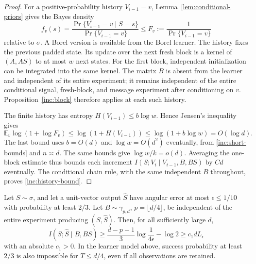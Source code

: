 \begin{proof}
For a positive-probability history \(V_{i-1}=v\),
Lemma~\ref{lem:conditional-priors} gives the Bayes density
\[
 f_v(s)=\frac{\Pr\{V_{i-1}=v\mid S=s\}}{\Pr\{V_{i-1}=v\}}
 \le F_v:=\frac1{\Pr\{V_{i-1}=v\}}
\]
relative to \(\sigma\).  A Borel version is available from the Borel
learner.  The history fixes the previous padded state.  Its update
over the next fresh block is a kernel of \((A,AS)\) to at most \(w\)
next states.  For the first block, independent initialization can be
integrated into the same kernel.  The matrix \(B\) is absent from the
learner and independent of its entire experiment; it remains independent
of the entire conditional signal, fresh-block, and message experiment
after conditioning on \(v\).
Proposition~\ref{inc:block} therefore applies at each such history.

The finite history has entropy
\(H(V_{i-1})\le b\log w\).  Hence Jensen's inequality gives
\[
 \mathbb E_v\log(1+\log F_v)
 \le\log(1+H(V_{i-1}))
 \le\log(1+b\log w)=O(\log d).
\]
The last bound uses \(b=O(d)\) and \(\log w=O(d^2)\) eventually, from
\eqref{inc:short-bounds} and \(n\asymp d\).  The same bounds give
\(\log w/k=o(d)\).  Averaging the one-block estimate thus bounds each
increment
\(I(S;V_i\mid V_{i-1},B,BS)\) by \(Cd\) eventually.
The conditional chain rule, with the same independent \(B\) throughout,
proves \eqref{inc:history-bound}.
\end{proof}

\begin{lemma}\label{inc:fiber-precision}
Let \(S\sim\sigma\), and let a unit-vector output \(\widehat S\) have
angular error at most \(\epsilon\le1/10\) with probability at least
\(2/3\).  Let \(B\sim\gamma_{p,d}\), \(p=\lfloor d/4\rfloor\), be
independent of the entire experiment producing \((S,\widehat S)\).
Then, for all sufficiently large \(d\),
\begin{equation}\label{inc:fiber-bound}
 I(S;\widehat S\mid B,BS)
 \ge \frac{d-p-1}{3}\log\frac1{4\epsilon}-\log2
 \ge c_1dL_\epsilon
\end{equation}
with an absolute \(c_1>0\).  In the learner model above, success
probability at least \(2/3\) is also impossible for \(T\le d/4\),
even if all observations are retained.
\end{lemma}

